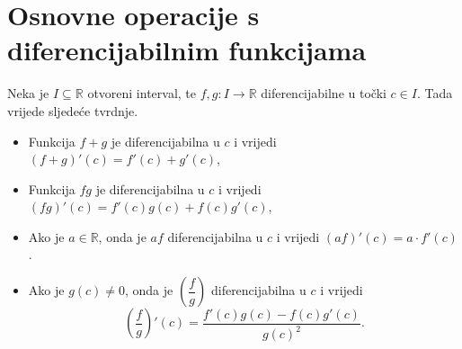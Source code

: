 \section{Osnovne operacije s diferencijabilnim funkcijama}
\begin{remark}
Neka je \(I\subseteq \mathbb{R}\) otvoreni interval, te \(f, g : I\to \mathbb{R}\) diferencijabilne u točki \(c\in I\). Tada vrijede sljedeće tvrdnje.
\begin{itemize}
\item[a)] Funkcija \(f+g\) je diferencijabilna u \(c\) i vrijedi \((f+g)'(c)=f'(c)+g'(c)\),
\item[b)] Funkcija \(fg\) je diferencijabilna u \(c\) i vrijedi \((fg)'(c)=f'(c)g(c)+f(c)g'(c)\),
\item[c)] Ako je \(a\in \mathbb{R}\), onda je \(af\) diferencijabilna u \(c\) i vrijedi \((af)'(c)=a\cdot f'(c)\).
\item[d)] Ako je \(g(c)\neq 0\), onda je \(\left(\dfrac{f}{g}\right)\) diferencijabilna u \(c\) i vrijedi \[\left(\dfrac{f}{g}\right)'(c)=\dfrac{f'(c)g(c)-f(c)g'(c)}{g(c)^2}.\] 
\end{itemize}
\end{remark}
